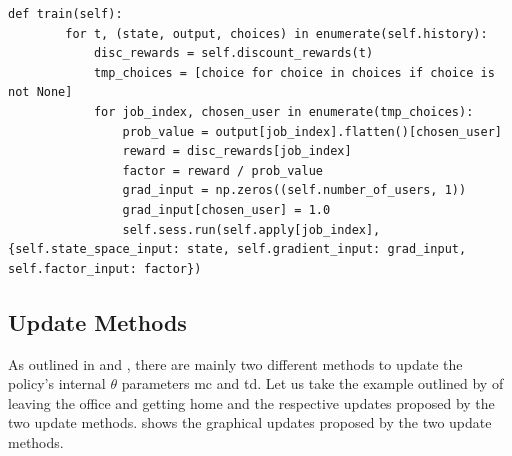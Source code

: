 \documentclass[draft=false]{seal_thesis}
\begin{document}
\begin{lstlisting}[caption=Backpropagation algorithm following a \gls{mc} update approach,label=lst:mc_backpropagation,style=CustomPython]
    def train(self):
        for t, (state, output, choices) in enumerate(self.history):
            disc_rewards = self.discount_rewards(t)
            tmp_choices = [choice for choice in choices if choice is not None]
            for job_index, chosen_user in enumerate(tmp_choices):
                prob_value = output[job_index].flatten()[chosen_user]
                reward = disc_rewards[job_index]
                factor = reward / prob_value
                grad_input = np.zeros((self.number_of_users, 1))
                grad_input[chosen_user] = 1.0
                self.sess.run(self.apply[job_index], {self.state_space_input: state, self.gradient_input: grad_input, self.factor_input: factor})
\end{lstlisting}

\subsection{Update Methods}
\label{subsec:update_methods}

As outlined in  and , there are mainly two different methods to update the policy's internal $\theta$ parameters \ie \gls{mc} and \gls{td}. Let us take the example outlined by \citet[p. 130]{Sutton2017} of leaving the office and getting home and the respective updates proposed by the two update methods.  shows the graphical updates proposed by the two update methods.

\end{document}
